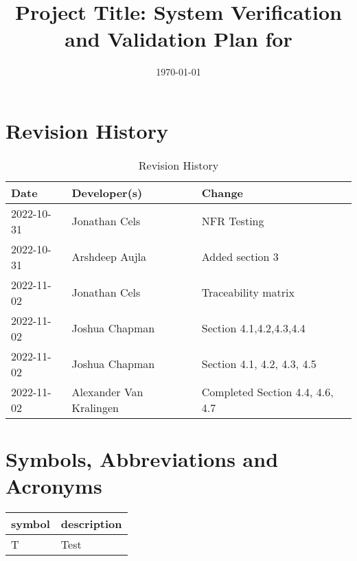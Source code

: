 \documentclass[12pt, titlepage]{article}
\begin{document}
\title{Project Title: System Verification and Validation Plan for \progname{}} 
\author{\authname}
\date{\today}
	
\maketitle


\section{Revision History}

\begin{table}[hp]
\caption{Revision History} \label{TblRevisionHistory}
\begin{tabularx}{\textwidth}{llX}
\toprule
\textbf{Date} & \textbf{Developer(s)} & \textbf{Change}\\
\midrule
2022-10-31 & Jonathan Cels & NFR Testing\\
2022-10-31 & Arshdeep Aujla & Added section 3\\
2022-11-02 & Jonathan Cels & Traceability matrix\\
2022-11-02 & Joshua Chapman & Section 4.1,4.2,4.3,4.4\\
2022-11-02 & Joshua Chapman & Section 4.1, 4.2, 4.3, 4.5\\
2022-11-02 & Alexander Van Kralingen & Completed Section 4.4, 4.6, 4.7\\
\bottomrule
\end{tabularx}
\end{table}

\newpage

\tableofcontents

\listoftables
{}

\listoffigures
{}

\newpage

\section{Symbols, Abbreviations and Acronyms}

\renewcommand{\arraystretch}{1.2}
\begin{tabular}{l l} 
  \toprule		
  \textbf{symbol} & \textbf{description}\\
  \midrule 
  T & Test\\
  \bottomrule
\end{tabular}\\
\end{document}
